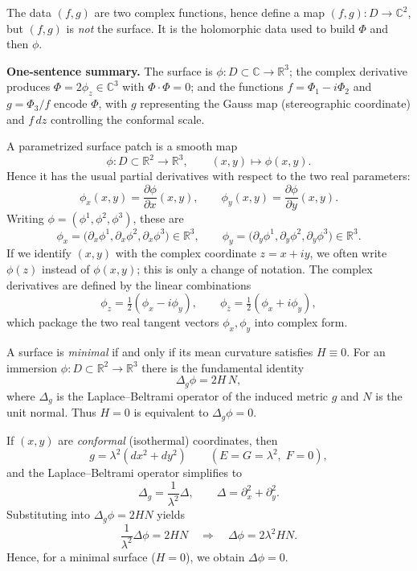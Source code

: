 \begin{problem}[CP-IV-0089]
\label{prob:cp-iv-0089}
\par\noindent\textbullet\quad The data $(f,g)$ are two complex functions, hence define a map $(f,g):D\to\mathbb C^2$,
	but $(f,g)$ is \emph{not} the surface. It is the holomorphic data used to build $\Phi$ and then $\phi$.

\medskip
\textbf{One-sentence summary.}
The surface is $\phi:D\subset\mathbb C\to\mathbb R^3$; the complex derivative produces $\Phi=2\phi_z\in\mathbb C^3$ with
$\Phi\cdot\Phi=0$; and the functions $f=\Phi_1-i\Phi_2$ and $g=\Phi_3/f$ encode $\Phi$, with $g$ representing the Gauss map
(stereographic coordinate) and $f\,dz$ controlling the conformal scale.

\medskip

A parametrized surface patch is a smooth map
\[
\phi : D \subset \mathbb R^2 \to \mathbb R^3,\qquad (x,y)\mapsto \phi(x,y).
\]
Hence it has the usual partial derivatives with respect to the two real parameters:
\[
\phi_x(x,y)=\frac{\partial \phi}{\partial x}(x,y),\qquad
\phi_y(x,y)=\frac{\partial \phi}{\partial y}(x,y).
\]
Writing $\phi=(\phi^1,\phi^2,\phi^3)$, these are
\[
\phi_x=\big(\partial_x\phi^1,\partial_x\phi^2,\partial_x\phi^3\big)\in\mathbb R^3,
\qquad
\phi_y=\big(\partial_y\phi^1,\partial_y\phi^2,\partial_y\phi^3\big)\in\mathbb R^3.
\]
If we identify $(x,y)$ with the complex coordinate $z=x+iy$, we often write $\phi(z)$ instead of $\phi(x,y)$; this is only
a change of notation.
The complex derivatives are defined by the linear combinations
\[
\phi_z=\tfrac12(\phi_x-i\phi_y),\qquad
\phi_{\bar z}=\tfrac12(\phi_x+i\phi_y),
\]
which package the two real tangent vectors $\phi_x,\phi_y$ into complex form.

\medskip

A surface is \emph{minimal} if and only if its mean curvature satisfies $H\equiv 0$.
For an immersion $\phi:D\subset\mathbb R^2\to\mathbb R^3$ there is the fundamental identity
\[
\Delta_g \phi = 2H\,N,
\]
where $\Delta_g$ is the Laplace--Beltrami operator of the induced metric $g$ and $N$ is the unit normal.
Thus $H=0$ is equivalent to $\Delta_g\phi=0$.

If $(x,y)$ are \emph{conformal} (isothermal) coordinates, then
\[
g=\lambda^2(dx^2+dy^2)\qquad (E=G=\lambda^2,\;F=0),
\]
and the Laplace--Beltrami operator simplifies to
\[
\Delta_g = \frac{1}{\lambda^2}\Delta,
\qquad
\Delta=\partial_x^2+\partial_y^2.
\]
Substituting into $\Delta_g\phi=2H N$ yields
\[
\frac{1}{\lambda^2}\Delta\phi = 2H N
\quad\Longrightarrow\quad
\Delta\phi = 2\lambda^2 H N.
\]
Hence, for a minimal surface ($H=0$), we obtain $\Delta\phi=0$.


\end{problem}
